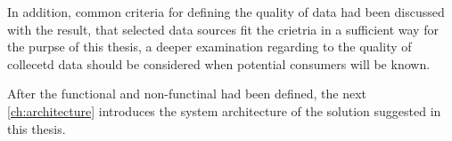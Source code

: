 In addition, common criteria for defining the quality of data had been discussed with the result, that selected data sources
fit the crietria in a sufficient way for the purpse of this thesis, a deeper examination regarding to the quality of collecetd data
should be considered when potential consumers will be known.

After the functional and non-functinal had been defined, the next \autoref{ch:architecture} introduces the system architecture
of the solution suggested in this thesis.
